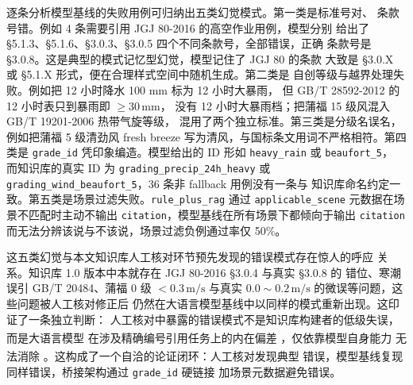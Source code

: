 \documentclass[a4paper]{article}
\theoremstyle{definition}
\theoremstyle{plain}
\theoremstyle{remark}
\newcommand{\reffig}[1]{图 \ref{#1}}
\newcommand{\reftab}[1]{表 \ref{#1}}
\let\oldcite\cite
\renewcommand{\cite}[1]{\textsuperscript{\oldcite{#1}}}
\newcommand{\bk}{\discretionary{}{}{}}
\begin{document}
逐条分析模型基线的失败用例可归纳出五类幻觉模式。第一类是标准号对、
条款号错。例如 4 条需要引用 JGJ 80-2016 的高空作业用例，模型分别
给出了 §5.1.3、§5.1.6、§3.0.3、§3.0.5 四个不同条款号，全部错误，正确
条款号是 §3.0.8。这是典型的模式记忆型幻觉，模型记住了 JGJ 80 的条款
大致是 §3.0.X 或 §5.1.X 形式，便在合理样式空间中随机生成。第二类是
自创等级与越界处理失败。例如把 12 小时降水 100 mm 标为 12 小时大暴雨，
但 GB/T 28592-2012 的 12 小时表只到暴雨即 $\geq 30\,\mathrm{mm}$，
没有 12 小时大暴雨档；把蒲福 15 级风混入 GB/T 19201-2006 热带气旋等级，
混用了两个独立标准。第三类是分级名误名，例如把蒲福 5 级清劲风 fresh
breeze 写为清风，与国标条文用词不严格相符。第四类是 \texttt{grade\_\bk{}id}
凭印象编造。模型给出的 ID 形如 \texttt{heavy\_\bk{}rain} 或 \texttt{beaufort\_\bk{}5}，
而知识库的真实 ID 为 \texttt{grading\_\bk{}precip\_\bk{}24h\_\bk{}heavy} 或
\texttt{grading\_\bk{}wind\_\bk{}beaufort\_\bk{}5}，36 条非 fallback 用例没有一条与
知识库命名约定一致。第五类是场景过滤失败。\texttt{rule\_\bk{}plus\_\bk{}rag}
通过 \texttt{applicable\_\bk{}scene} 元数据在场景不匹配时主动不输出
\texttt{citation}，模型基线在所有场景下都倾向于输出 \texttt{citation}
而无法分辨该说与不该说，场景过滤负例通过率仅 50\%。

这五类幻觉与本文知识库人工核对环节预先发现的错误模式存在惊人的呼应
关系。知识库 1.0 版本中本就存在 JGJ 80-2016 §3.0.4 与真实 §3.0.8 的
错位、寒潮误引 GB/T 20484、蒲福 0 级 $<0.3\,\mathrm{m/s}$ 与真实
$0.0\sim0.2\,\mathrm{m/s}$ 的微误等问题，这些问题被人工核对修正后
仍然在大语言模型基线中以同样的模式重新出现。这印证了一条独立判断：
人工核对中暴露的错误模式不是知识库构建者的低级失误，而是大语言模型
在涉及精确编号引用任务上的内在偏差 \cite{ref20}，仅依靠模型自身能力
无法消除 \cite{ref10}。这构成了一个自洽的论证闭环：人工核对发现典型
错误，模型基线复现同样错误，桥接架构通过 \texttt{grade\_\bk{}id} 硬链接
加场景元数据避免错误。


﻿%
\end{document}
